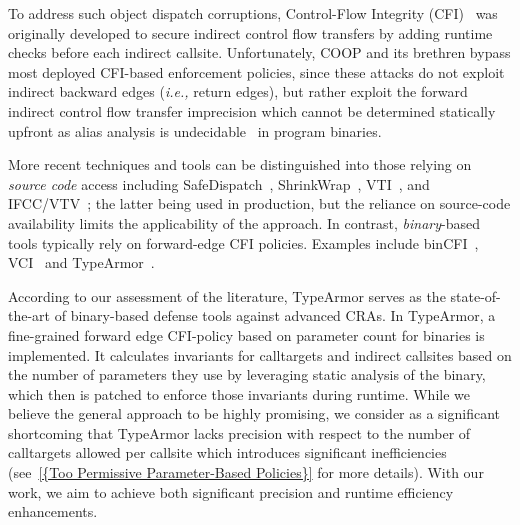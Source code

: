 To address such object dispatch corruptions, Control-Flow Integrity (CFI)~\cite{abadi:cfi2, abadi:cfi} was originally developed to secure indirect control flow transfers by adding 
runtime checks before each indirect callsite. Unfortunately, COOP and its brethren bypass most deployed CFI-based enforcement policies, since these attacks do not exploit indirect 
backward edges (\textit{i.e.,} return edges), but rather exploit the forward indirect control flow transfer imprecision which cannot be determined statically upfront as alias analysis is 
undecidable~\cite{alias:undecidable} in program binaries.

More recent techniques and tools can be distinguished into those relying on \textit{source code} access including SafeDispatch~\cite{safedispatch:jang}, ShrinkWrap~\cite{haller:shrinkwrap}, 
VTI~\cite{bounov:interleaving}, and IFCC/VTV~\cite{vtv:tice}; the latter being used in production, but the reliance on source-code availability limits the applicability of the approach. 
In contrast, \textit{binary}-based tools typically rely on forward-edge CFI policies. Examples include binCFI~\cite{ccfir:zhang, zhang:usenix}, VCI~\cite{vci:asiaccs} and 
TypeArmor~\cite{veen:typearmor}. 

According to our assessment of the literature, TypeArmor serves as the state-of-the-art of binary-based defense tools against advanced CRAs. In TypeArmor, a fine-grained 
forward edge CFI-policy based on parameter count for binaries is implemented. It calculates invariants for calltargets and indirect callsites based on the number of parameters they use 
by leveraging static analysis of the binary, which then is patched to enforce those invariants during runtime. While we believe the general approach to be highly promising, we consider 
as a significant shortcoming that TypeArmor lacks precision with respect to the number of calltargets allowed per callsite which introduces significant 
inefficiencies (see~\cref{{Too Permissive Parameter-Based Policies}} for more details). 
With our work, we aim to achieve both significant precision and runtime efficiency enhancements.

